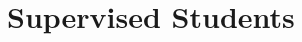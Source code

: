 \documentclass[a4paper,10pt]{article} %
\begin{document}


\section{Supervised Students}
\end{document}
